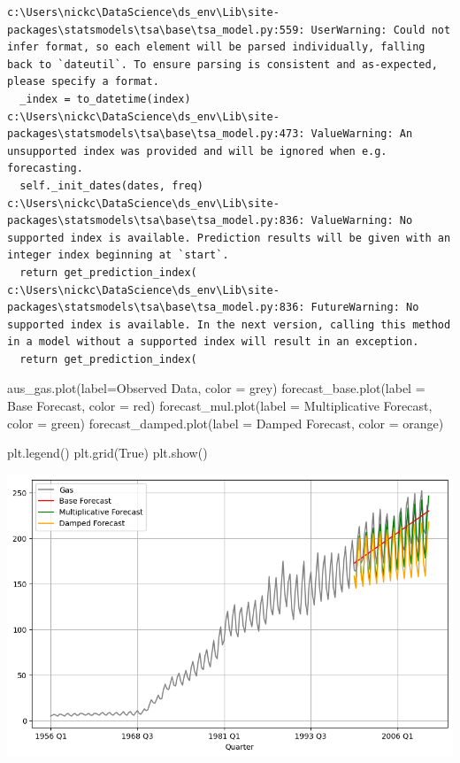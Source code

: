 \documentclass[
  11pt,
]{article}
\newenvironment{Shaded}{\begin{snugshade}}{\end{snugshade}}
\newcommand{\NormalTok}[1]{\textcolor[rgb]{0.00,0.23,0.31}{#1}}
\newcommand{\OperatorTok}[1]{\textcolor[rgb]{0.37,0.37,0.37}{#1}}
\newcommand{\StringTok}[1]{\textcolor[rgb]{0.13,0.47,0.30}{#1}}
\newcommand{\VariableTok}[1]{\textcolor[rgb]{0.07,0.07,0.07}{#1}}
\begin{document}
\begin{verbatim}
c:\Users\nickc\DataScience\ds_env\Lib\site-packages\statsmodels\tsa\base\tsa_model.py:559: UserWarning: Could not infer format, so each element will be parsed individually, falling back to `dateutil`. To ensure parsing is consistent and as-expected, please specify a format.
  _index = to_datetime(index)
c:\Users\nickc\DataScience\ds_env\Lib\site-packages\statsmodels\tsa\base\tsa_model.py:473: ValueWarning: An unsupported index was provided and will be ignored when e.g. forecasting.
  self._init_dates(dates, freq)
c:\Users\nickc\DataScience\ds_env\Lib\site-packages\statsmodels\tsa\base\tsa_model.py:836: ValueWarning: No supported index is available. Prediction results will be given with an integer index beginning at `start`.
  return get_prediction_index(
c:\Users\nickc\DataScience\ds_env\Lib\site-packages\statsmodels\tsa\base\tsa_model.py:836: FutureWarning: No supported index is available. In the next version, calling this method in a model without a supported index will result in an exception.
  return get_prediction_index(
\end{verbatim}

\begin{Shaded}
\begin{Highlighting}[]
\NormalTok{aus\_gas.plot(label}\OperatorTok{=}\StringTok{\textquotesingle{}Observed Data\textquotesingle{}}\NormalTok{, color }\OperatorTok{=} \StringTok{\textquotesingle{}grey\textquotesingle{}}\NormalTok{)}
\NormalTok{forecast\_base.plot(label }\OperatorTok{=} \StringTok{\textquotesingle{}Base Forecast\textquotesingle{}}\NormalTok{, color }\OperatorTok{=} \StringTok{\textquotesingle{}red\textquotesingle{}}\NormalTok{)}
\NormalTok{forecast\_mul.plot(label }\OperatorTok{=} \StringTok{\textquotesingle{}Multiplicative Forecast\textquotesingle{}}\NormalTok{, color }\OperatorTok{=} \StringTok{\textquotesingle{}green\textquotesingle{}}\NormalTok{)}
\NormalTok{forecast\_damped.plot(label }\OperatorTok{=} \StringTok{\textquotesingle{}Damped Forecast\textquotesingle{}}\NormalTok{, color }\OperatorTok{=} \StringTok{\textquotesingle{}orange\textquotesingle{}}\NormalTok{)}

\NormalTok{plt.legend()}
\NormalTok{plt.grid(}\VariableTok{True}\NormalTok{)}
\NormalTok{plt.show()}
\end{Highlighting}
\end{Shaded}

\includegraphics{hw5_files/figure-pdf/cell-42-output-1.png}
\end{document}
